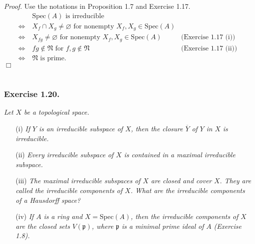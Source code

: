\documentclass{article}
\begin{document}
\emph{Proof.}
Use the notations in Proposition 1.7 and Exercise 1.17.
\begin{align*}
  & \: \text{$\mathrm{Spec}(A)$ is irreducible} \\
  \Longleftrightarrow& \:
  \text{$X_f \cap X_g \neq \varnothing$ for nonempty $X_f, X_g \in \mathrm{Spec}(A)$} \\
  \Longleftrightarrow& \:
  \text{$X_{fg} \neq \varnothing$ for nonempty $X_f, X_g \in \mathrm{Spec}(A)$}
    &\text{(Exercise 1.17 (i))} \\
  \Longleftrightarrow& \:
  \text{$fg \not\in \mathfrak{N}$ for $f,g \not\in \mathfrak{N}$}
    &\text{(Exercise 1.17 (ii))} \\
  \Longleftrightarrow& \:
  \text{$\mathfrak{N}$ is prime.}
\end{align*}
$\Box$ \\\\






\subsubsection*{Exercise 1.20.}
\emph{Let $X$ be a topological space.}
\begin{enumerate}
\item[(i)]
  \emph{If $Y$ is an irreducible subspace of $X$, then the closure $\overline{Y}$
  of $Y$ in $X$ is irreducible.}

\item[(ii)]
  \emph{Every irreducible subspace of $X$ is contained in a maximal irreducible subspace.}

\item[(iii)]
  \emph{The maximal irreducible subspaces of $X$ are closed and cover $X$.
  They are called the irreducible components of $X$.
  What are the irreducible components of a Hausdorff space?}

\item[(iv)]
  \emph{If $A$ is a ring and $X = \mathrm{Spec}(A)$,
  then the irreducible components of $X$ are the closed sets $V(\mathfrak{p})$,
  where $\mathfrak{p}$ is a minimal prime ideal of $A$ (Exercise 1.8).} \\
\end{enumerate}
\end{document}
